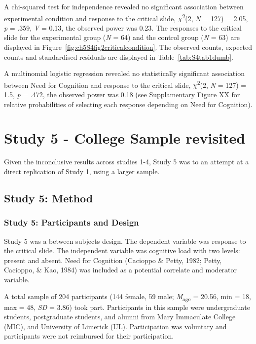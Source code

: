 \documentclass[
  american,
  man,floatsintext]{apa7}
\begin{document}
A chi-squared test for independence revealed no significant association between experimental condition and response to the critical slide, \(\chi\)\textsuperscript{2}(2, \emph{N} = 127) = 2.05, \emph{p} = .359, \emph{V} = 0.13, the observed power was 0.23. The responses to the critical slide for the experimental group (\emph{N} = 64) and the control group (\emph{N} = 63) are displayed in Figure~\ref{fig:ch5S4fig2criticalcondition}. The observed counts, expected counts and standardised residuals are displayed in Table~\ref{tab:S4tab1dumb}.

A multinomial logistic regression revealed no statistically significant association between Need for Cognition and response to the critical slide, \(\chi\)\textsuperscript{2}(2, \emph{N} = 127) = 1.5, \emph{p} = .472, the observed power was 0.18 (see Supplamentary Figure XX for relative probabilities of selecting each response depending on Need for Cognition).

\hypertarget{study-5---college-sample-revisited}{%
\section{Study 5 - College Sample revisited}\label{study-5---college-sample-revisited}}

Given the inconclusive results across studies 1-4, Study 5 was to an attempt at a direct replication of Study 1, using a larger sample.

\hypertarget{study-5-method}{%
\subsection{Study 5: Method}\label{study-5-method}}

\hypertarget{study-5-participants-and-design}{%
\subsubsection{Study 5: Participants and Design}\label{study-5-participants-and-design}}

Study 5 was a between subjects design. The dependent variable was response to the critical slide. The independent variable was cognitive load with two levels: present and absent. Need for Cognition (Cacioppo \& Petty, 1982; Petty, Cacioppo, \& Kao, 1984) was included as a potential correlate and moderator variable.

A total sample of 204 participants (144 female, 59 male; \emph{M}\textsubscript{age} = 20.56, min = 18, max = 48, \emph{SD} = 3.86) took part. Participants in this sample were undergraduate students, postgraduate students, and alumni from Mary Immaculate College (MIC), and University of Limerick (UL). Participation was voluntary and participants were not reimbursed for their participation.
\end{document}

